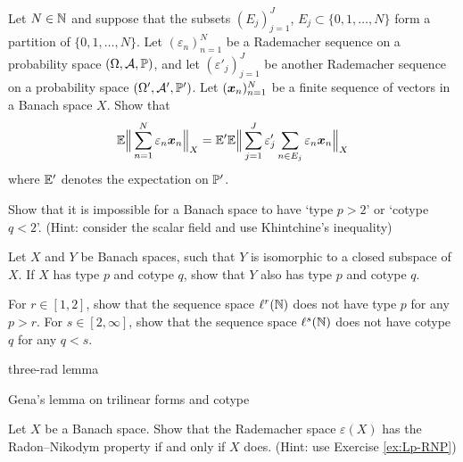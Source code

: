 \begin{exercise}
  Let $N \in \N$ and suppose that the subsets $(E_{j})_{j=1}^{J}$, $E_{j} \subset \{0,1,\ldots,N\}$ form a partition of $\{0,1,\ldots,N\}$.
  Let $(\varepsilon_{n})_{n=1}^{N}$ be a Rademacher sequence on a probability space $(\Omega,\mc{A},\P)$, and let $(\varepsilon'_{j})_{j=1}^{J}$ be another Rademacher sequence on a probability space $(\Omega', \mc{A}', \P')$.
  Let $(\mb{x}_{n})_{n=1}^{N}$ be a finite sequence of vectors in a Banach space $X$.
  Show that
  \begin{equation*}
    \E \Big\| \sum_{n=1}^{N} \varepsilon_{n} \mb{x}_{n} \Big\|_{X} = \E' \E \Big\| \sum_{j=1}^{J} \varepsilon'_{j} \sum_{n \in E_{j}} \varepsilon_{n} \mb{x}_{n} \Big\|_{X}
  \end{equation*}
  where $\E'$ denotes the expectation on $\P'$.
\end{exercise}

\begin{exercise}\label{ex:no-extreme-types}
  Show that it is impossible for a Banach space to have `type $p > 2$' or `cotype $q < 2$'. (Hint: consider the scalar field and use Khintchine's inequality)
\end{exercise}

\begin{exercise}
  Let $X$ and $Y$ be Banach spaces, such that $Y$ is isomorphic to a closed subspace of $X$.
  If $X$ has type $p$ and cotype $q$, show that $Y$ also has type $p$ and cotype $q$.
\end{exercise}

\begin{exercise}
  For $r \in [1,2]$, show that the sequence space $\ell^{r}(\N)$ does not have type $p$ for any $p > r$.
  For $s \in [2,\infty]$, show that the sequence space $\ell^{s}(\N)$ does not have cotype $q$ for any $q < s$.
\end{exercise}

\begin{exercise}
  { \color{blue} three-rad lemma }
\end{exercise}

\begin{exercise}
  { \color{blue} Gena's lemma on trilinear forms and cotype }
\end{exercise}

\begin{exercise}
  Let $X$ be a Banach space.
  Show that the Rademacher space $\varepsilon(X)$ has the Radon--Nikodym property if and only if $X$ does. (Hint: use Exercise \ref{ex:Lp-RNP})
\end{exercise}

